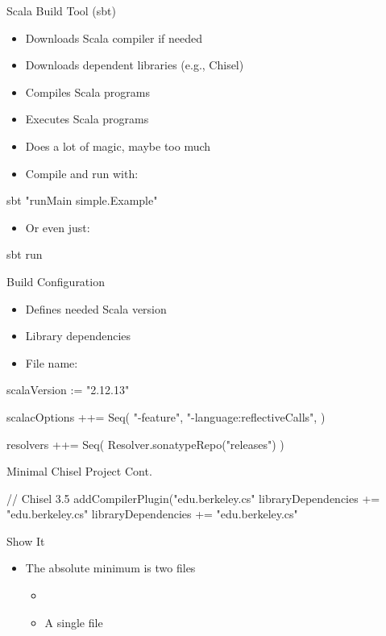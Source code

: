 \begin{frame}[fragile]{Scala Build Tool (sbt)}
\begin{itemize}
\item Downloads Scala compiler if needed
\item Downloads dependent libraries (e.g., Chisel)
\item Compiles Scala programs
\item Executes Scala programs
\item Does a lot of magic, maybe too much
\item Compile and run with:
\end{itemize}
\begin{chisel}
sbt "runMain simple.Example"
\end{chisel}
\begin{itemize}
\item Or even just:
\end{itemize}
\begin{chisel}
sbt run
\end{chisel}
\end{frame}

\begin{frame}[fragile]{Build Configuration}
\begin{itemize}
\item Defines needed Scala version
\item Library dependencies
\item File name: 
\end{itemize}
\begin{chisel}
scalaVersion := "2.12.13"

scalacOptions ++= Seq(
  "-feature",
  "-language:reflectiveCalls",
)

resolvers ++= Seq(
  Resolver.sonatypeRepo("releases")
)
\end{chisel}
\end{frame}

\begin{frame}[fragile]{Minimal Chisel Project Cont.}
\begin{chisel}
// Chisel 3.5
addCompilerPlugin("edu.berkeley.cs" %
libraryDependencies += "edu.berkeley.cs" %
libraryDependencies += "edu.berkeley.cs" %
\end{chisel}
\end{frame}

\begin{frame}[fragile]{Show It}
\begin{itemize}
\item The absolute minimum is two files
\begin{itemize}
\item {}
\item A single  file
\end{itemize}
\end{itemize}
\end{frame}

